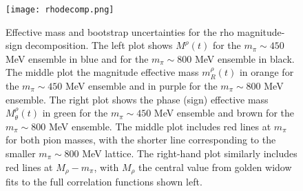 \begin{figure}[!ht] \centering
  \texttt{[image: rhodecomp.png]}
  \caption{Effective mass and bootstrap uncertainties for the rho magnitude-sign decomposition. The left plot shows $M^\rho(t)$ for the $m_\pi \sim 450$ MeV ensemble in blue and for the $m_\pi \sim 800$ MeV ensemble in black. The middle plot the magnitude effective mass $m_R^{\rho}(t)$ in orange for the $m_\pi \sim 450$ MeV ensemble and in purple for the $m_\pi \sim 800$ MeV ensemble. The right plot shows the phase (sign) effective mass $M_\theta^{\rho}(t)$ in green for the $m_\pi \sim 450$ MeV ensemble and brown for the $m_\pi \sim 800$ MeV ensemble. The middle plot includes red lines at $m_\pi$ for both pion masses, with the shorter line corresponding to the smaller $m_\pi \sim 800$ MeV lattice. The right-hand plot similarly includes red lines at $M_\rho - m_\pi$, with $M_\rho$ the central value from golden widow fits to the full correlation functions shown left.
  }
  \label{fig:RhoEM}
\end{figure}


